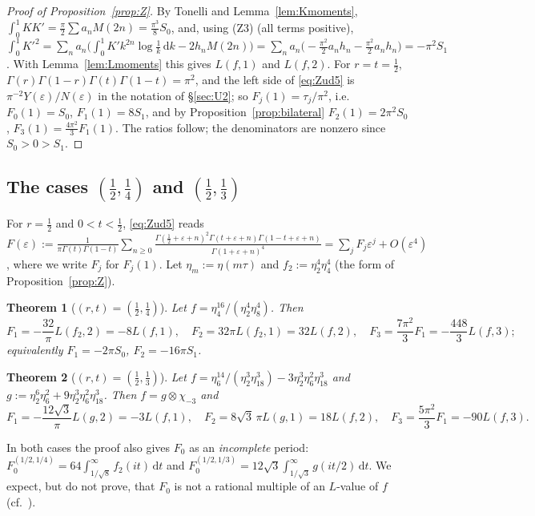 \documentclass[11pt]{amsart}
\newtheorem{theorem}{Theorem}[section]
\theoremstyle{definition}
\theoremstyle{remark}
\numberwithin{equation}{section}
\newcommand{\dd}{\,\mathrm{d}}
\begin{document}
\begin{proof}[Proof of Proposition~\ref{prop:Z}]
By Tonelli and Lemma~\ref{lem:Kmoments}, $\int_0^1KK'=\frac\pi2\sum a_nM(2n)=\frac{\pi^3}8S_0$, and, using (Z3) (all terms positive),
$\int_0^1K'^2=\sum_na_n\bigl(\int_0^1K'k^{2n}\log\frac1k\dd k-2h_nM(2n)\bigr)=\sum_na_n\bigl(-\frac{\pi^2}2a_nh_n-\frac{\pi^2}2a_nh_n\bigr)=-\pi^2S_1$. With Lemma~\ref{lem:Lmoments} this gives $L(f,1)$ and $L(f,2)$.
For $r=t=\frac12$, $\Gamma(r)\Gamma(1-r)\Gamma(t)\Gamma(1-t)=\pi^2$, and the left side of \eqref{eq:Zud5} is $\pi^{-2}Y(\varepsilon)/N(\varepsilon)$ in the notation of \S\ref{sec:U2}; so $F_j(1)=\tau_j/\pi^2$, i.e.\ $F_0(1)=S_0$, $F_1(1)=8S_1$, and by Proposition~\ref{prop:bilateral} $F_2(1)=2\pi^2S_0$, $F_3(1)=\frac{4\pi^2}3F_1(1)$. The ratios follow; the denominators are nonzero since $S_0>0>S_1$.
\end{proof}

\subsection{\texorpdfstring{The cases $(\frac12,\frac14)$ and $(\frac12,\frac13)$}{The cases (1/2,1/4) and (1/2,1/3)}}
For $r=\frac12$ and $0<t<\frac12$, \eqref{eq:Zud5} reads $F(\varepsilon):=\frac1{\pi\Gamma(t)\Gamma(1-t)}\sum_{n\ge0}\frac{\Gamma(\frac12+\varepsilon+n)^2\Gamma(t+\varepsilon+n)\Gamma(1-t+\varepsilon+n)}{\Gamma(1+\varepsilon+n)^4}=\sum_jF_j\varepsilon^j+O(\varepsilon^4)$, where we write $F_j$ for $F_j(1)$. Let $\eta_m:=\eta(m\tau)$ and $f_2:=\eta_2^4\eta_4^4$ (the form of Proposition~\ref{prop:Z}).

\begin{theorem}[$(r,t)=(\frac12,\frac14)$]\label{thm:Z2}
Let $f=\eta_4^{16}/(\eta_2^4\eta_8^4)$. Then
\[
F_1=-\frac{32}\pi L(f_2,2)=-8L(f,1),\quad F_2=32\pi L(f_2,1)=32L(f,2),\quad F_3=\frac{7\pi^2}3F_1=-\frac{448}3L(f,3);
\]
equivalently $F_1=-2\pi S_0$, $F_2=-16\pi S_1$.
\end{theorem}

\begin{theorem}[$(r,t)=(\frac12,\frac13)$]\label{thm:Z3}
Let $f=\eta_6^{14}/(\eta_2^3\eta_{18}^3)-3\eta_2^3\eta_6^2\eta_{18}^3$ and $g:=\eta_2^6\eta_6^2+9\eta_2^3\eta_6^2\eta_{18}^3$. Then $f=g\otimes\chi_{-3}$ and
\[
F_1=-\frac{12\sqrt3}\pi L(g,2)=-3L(f,1),\quad F_2=8\sqrt3\,\pi L(g,1)=18L(f,2),\quad F_3=\frac{5\pi^2}3F_1=-90L(f,3).
\]
\end{theorem}

In both cases the proof also gives $F_0$ as an \emph{incomplete} period: $F_0^{(1/2,1/4)}=64\int_{1/\sqrt8}^\infty f_2(it)\dd t$ and $F_0^{(1/2,1/3)}=12\sqrt3\int_{1/\sqrt3}^\infty g(it/2)\dd t$. We expect, but do not prove, that $F_0$ is not a rational multiple of an $L$-value of $f$ (cf.\ \cite[Remark~2]{Zud}).
\end{document}

